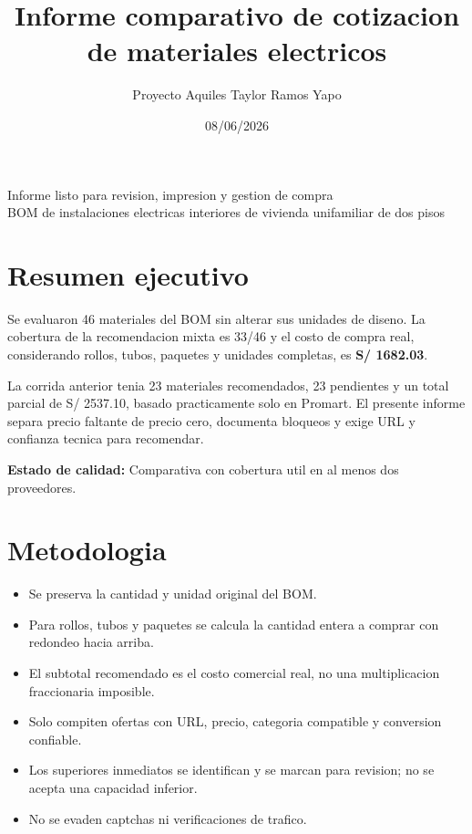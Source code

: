 \documentclass[11pt,a4paper]{article}
\title{Informe comparativo de cotizacion de materiales electricos}
\author{Proyecto Aquiles Taylor Ramos Yapo}
\date{08/06/2026}
\begin{document}
\maketitle
\thispagestyle{empty}
\vfill
\begin{center}
\large Informe listo para revision, impresion y gestion de compra\\[8pt]
\normalsize BOM de instalaciones electricas interiores de vivienda unifamiliar de dos pisos
\end{center}
\vfill
\newpage
\tableofcontents
\newpage

\section{Resumen ejecutivo}
Se evaluaron 46 materiales del BOM sin alterar sus unidades de diseno. La cobertura de la recomendacion mixta es 33/46 y el costo de compra real, considerando rollos, tubos, paquetes y unidades completas, es \textbf{S/ 1682.03}.

La corrida anterior tenia 23 materiales recomendados, 23 pendientes y un total parcial de S/ 2537.10, basado practicamente solo en Promart. El presente informe separa precio faltante de precio cero, documenta bloqueos y exige URL y confianza tecnica para recomendar.

\textbf{Estado de calidad:} Comparativa con cobertura util en al menos dos proveedores.

\section{Metodologia}
\begin{itemize}
\item Se preserva la cantidad y unidad original del BOM.
\item Para rollos, tubos y paquetes se calcula la cantidad entera a comprar con redondeo hacia arriba.
\item El subtotal recomendado es el costo comercial real, no una multiplicacion fraccionaria imposible.
\item Solo compiten ofertas con URL, precio, categoria compatible y conversion confiable.
\item Los superiores inmediatos se identifican y se marcan para revision; no se acepta una capacidad inferior.
\item No se evaden captchas ni verificaciones de trafico.
\end{itemize}
\end{document}
